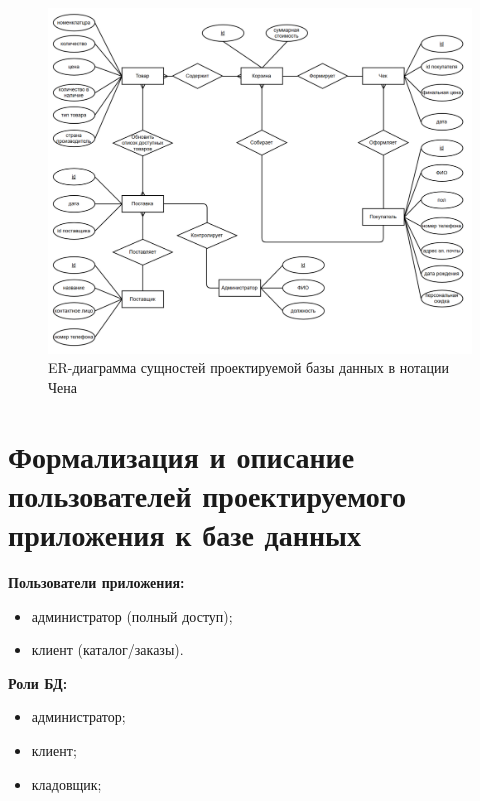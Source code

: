 \begin{figure}
	\centering
	\includegraphics[width=1\linewidth]{"pictures/ER Chen"}
	\caption{ER-диаграмма сущностей проектируемой базы данных в нотации Чена}
	\label{fig:ER}
\end{figure}


\section{Формализация и описание пользователей проектируемого приложения к базе данных}

\textbf{Пользователи приложения:}
\begin{itemize}
	\item администратор (полный доступ);
	\item клиент (каталог/заказы).
\end{itemize}

\textbf{Роли БД:}
\begin{itemize}
	\item администратор;
	\item клиент;
	\item кладовщик;
\end{itemize}

